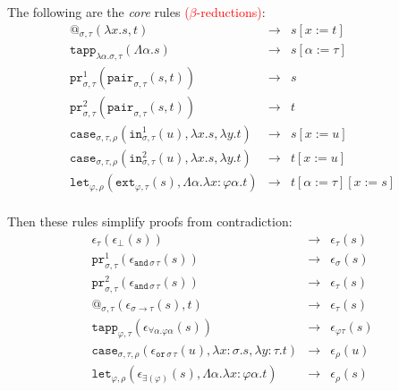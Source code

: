 \documentclass[a4paper,UKenglish,cleveref,autoref,numberwithinsect]{lipics-v2019}
\theoremstyle{definition}
\newcommand{\arrtype}{\rightarrow}
\newcommand{\quant}[2]{\forall #1.#2}
\newcommand{\abs}[2]{\lambda #1.#2}
\newcommand{\tabs}[2]{\Lambda #1.#2}
\newcommand{\red}{\longrightarrow}
\newcommand{\proj}{\mathtt{pr}}
\newcommand{\LCchange}[1]{\textcolor{red}{#1}}
\begin{document}
The following are the \emph{core} rules \LCchange{($\beta$-reductions)}:
\[
\begin{array}{rcl}
@_{\sigma,\tau}(\abs{x}{s},t) & \red & s[x:=t] \\
\mathtt{tapp}_{\abs{\alpha}{\sigma},\tau}(\tabs{\alpha}{s}) & \red &
  s[\alpha:=\tau] \\
\proj^1_{\sigma,\tau}(\mathtt{pair}_{\sigma,\tau}(s,t)) & \red & s \\
\proj^2_{\sigma,\tau}(\mathtt{pair}_{\sigma,\tau}(s,t)) & \red & t \\
\mathtt{case}_{\sigma,\tau,\rho}(\mathtt{in}^1_{\sigma,\tau}(u),
  \abs{x}{s},\abs{y}{t}) & \red & s[x:=u] \\
\mathtt{case}_{\sigma,\tau,\rho}(\mathtt{in}^2_{\sigma,\tau}(u),
  \abs{x}{s},\abs{y}{t}) & \red & t[x:=u] \\
\mathtt{let}_{\varphi,\rho}(\mathtt{ext}_{\varphi,\tau}(s),\tabs{\alpha}{\abs{x:\varphi \alpha}{t}}) & \red & t[\alpha:=\tau][x:=s] \\
\end{array}
\]

Then these rules simplify proofs from contradiction:
\[
\begin{array}{rclrcl}
\epsilon_\tau(\epsilon_\bot(s)) & \red & \epsilon_\tau(s) \\
\proj^1_{\sigma,\tau}(\epsilon_{\mathtt{and}\,\sigma\,\tau}(s)) & \red &
  \epsilon_\sigma(s) \\
\proj^2_{\sigma,\tau}(\epsilon_{\mathtt{and}\,\sigma\,\tau}(s)) & \red &
  \epsilon_\tau(s) \\
@_{\sigma,\tau}(\epsilon_{\sigma \arrtype \tau}(s),t) & \red &
  \epsilon_\tau(s) \\
\mathtt{tapp}_{\varphi,\tau}(
  \epsilon_{\quant{\alpha}{\varphi\alpha}}(s)) & \red &
  \epsilon_{\varphi\tau}(s) \\
\mathtt{case}_{\sigma,\tau,\rho}(\epsilon_{\mathtt{or}\,\sigma\,\tau}(
  u),\abs{x:\sigma}{s},\abs{y:\tau}{t}) & \red & \epsilon_\rho(u) \\
\mathtt{let}_{\varphi,\rho}(\epsilon_{\exists(\varphi)}(s),\tabs{\alpha}{\abs{x:\varphi\alpha}{t}}) & \red &
  \epsilon_\rho(s) \\
\end{array}
\]
\end{document}
